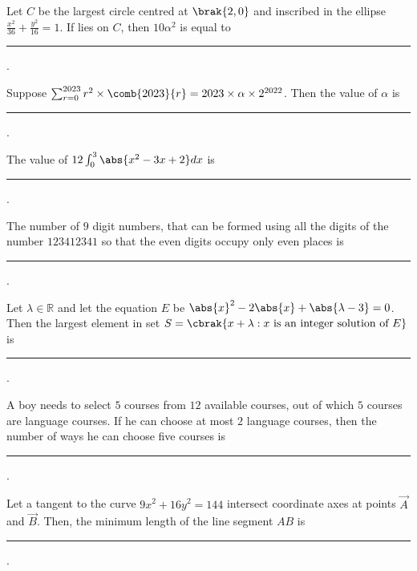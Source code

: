 \iffalse
\title{2023}
\author{EE24Btech11024 - G. Abhimanyu Koushik}
\section{integer}
\fi

\item Let $C$ be the largest circle centred at $\brak{2,0}$ and inscribed in the ellipse $\frac{x^2}{36}+\frac{y^2}{16}=1$. If  lies on $C$, then $10\alpha^2$ is equal to \rule{1cm}{0.15mm}.

\hfill{}

\item Suppose $\sum_{r=0}^{2023}r^2\times\comb{2023}{r} = 2023\times\alpha\times 2^{2022}$. Then the value of $\alpha$ is \rule{1cm}{0.15mm}.

\hfill{}

\item The value of $12\int_{0}^{3}\abs{x^2-3x+2}dx$ is \rule{1cm}{0.15mm}.

\hfill{}

\item The number of $9$ digit numbers, that can be formed using all the digits of the number $123412341$ so that the even digits occupy only even places is \rule{1cm}{0.15mm}.

\hfill{}

\item Let $\lambda \in \mathbb{R}$ and let the equation $E$ be $\abs{x}^2-2\abs{x}+\abs{\lambda-3}=0$. Then the largest element in set $S=\cbrak{x+\lambda:x\text{ is an integer solution of }E}$ is \rule{1cm}{0.15mm}.

\hfill{}

\item A boy needs to select $5$ courses from $12$ available courses, out of which $5$ courses are language courses. If  he can choose at most $2$ language courses, then the number of ways he can choose five courses is \rule{1cm}{0.15mm}.

\hfill{}

\item Let a tangent to the curve $9x^2+16y^2=144$ intersect coordinate axes at points $\vec{A}$ and $\vec{B}$. Then, the minimum length of the line segment $AB$ is \rule{1cm}{0.15mm}.

\hfill{}

